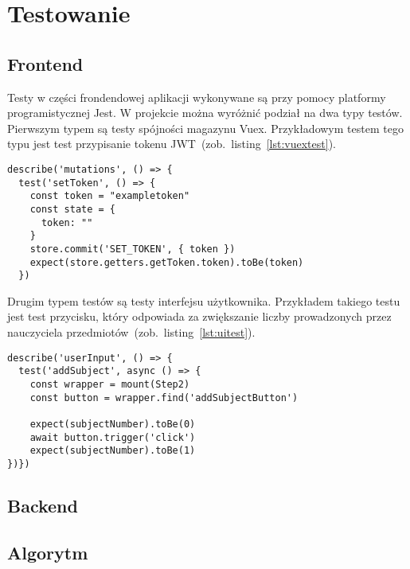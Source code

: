 
\chapter{Testowanie}
\section{Frontend}
Testy w części frondendowej aplikacji wykonywane są przy pomocy platformy programistycznej Jest. W projekcie można wyróżnić podział na dwa typy testów. Pierwszym typem są testy spójności magazynu Vuex. Przykładowym testem tego typu jest test przypisanie tokenu JWT~(zob.~listing~\ref{lst:vuextest}).
\begin{lstlisting}[caption=Test spójności magazynu Vuex,label={lst:vuextest}] 
describe('mutations', () => {
  test('setToken', () => {
    const token = "exampletoken"
    const state = {
      token: ""
    }
    store.commit('SET_TOKEN', { token })
    expect(store.getters.getToken.token).toBe(token)
  })
\end{lstlisting}

Drugim typem testów są testy interfejsu użytkownika. Przykładem takiego testu jest test przycisku, który odpowiada za zwiększanie liczby prowadzonych przez nauczyciela przedmiotów~(zob.~listing~\ref{lst:uitest}).
\begin{lstlisting}[caption=Test interfejsu użytkownika,label={lst:uitest}] 
describe('userInput', () => {
  test('addSubject', async () => {
    const wrapper = mount(Step2)
    const button = wrapper.find('addSubjectButton')

    expect(subjectNumber).toBe(0)
    await button.trigger('click')
    expect(subjectNumber).toBe(1)
})})
\end{lstlisting}
\section{Backend}
\section{Algorytm}

